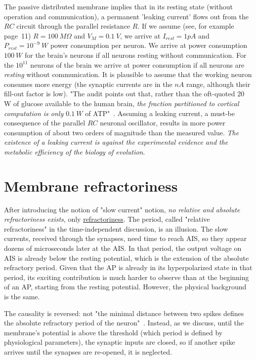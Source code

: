 The passive distributed membrane implies that in its resting state (without operation and communication), a permanent 'leaking current' flows out from the $RC$ circuit through the 
parallel resistance $R$. If we assume (see, for example~\cite{KochBiophysics:1999} page~11) $R=100\ M\Omega$ 
and $V_M=0.1~V$, we arrive at $I_{rest}=1pA$ and $P_{rest}=10^{-9}~W$ power consumption per neuron. 
We arrive at power consumption $100\ W$ for the brain's neurons if all neurons resting without communication.
For the $10^{11}$ neurons of the brain
we arrive at  power consumption if all neurons are  \textit{resting} without communication.
It is plausible to assume that the working neuron consumes more energy (the synaptic currents are in the $nA$ range, although their fill-out factor is low).
"The audit points out that, rather than the oft-quoted 20 W of glucose available to the human brain, \textit{the fraction partitioned to cortical computation is only $0.1~W$} of ATP"~\cite{EnergyNeuralCommunication:2021}.
Assuming a leaking current, a must-be consequence of the parallel  $RC$ neuronal oscillator, results in more power consumption of about two orders of magnitude than the measured value.
\textit{The existence of a leaking current is against the experimental evidence and 
the metabolic efficiency of the biology of evolution}. 


\section{Membrane refractoriness\label{sec:Physiology-FallaciesRefractoriness}}

After introducing the notion of "slow current" notion,
\textit{no relative and absolute refractoriness exists}, only \href{href="https://neuronaldynamics.epfl.ch/online/Ch2.S2.html}{refractoriness}.
The period,
called "relative refractoriness" in the time-independent discussion,
is an illusion. 
The slow currents, received through the synapses, need time to reach
\gls{AIS}, so they  appear
dozens of microseconds later at the \gls{AIS}.
In that period, the output voltage on \gls{AIS}
is already below the resting potential,
which is the extension of the absolute
refractory period. 
Given that the \gls{AP} is already in its
hyperpolarized state in that period,  
its exciting contribution is much harder to observe
than at the beginning of an \gls{AP}, starting from
the resting potential. However, the physical background is the same.

The causality is reversed:
not "the minimal distance between two spikes defines the absolute refractory period
of the neuron"~\cite{NeuralDynamicsGertsner:2014}. Instead, as we discuss, until the membrane's potential
is above the threshold (which period is defined by physiological parameters),
the synaptic inputs are closed, so if another spike arrives until
the synapses are re-opened, it is neglected. 

